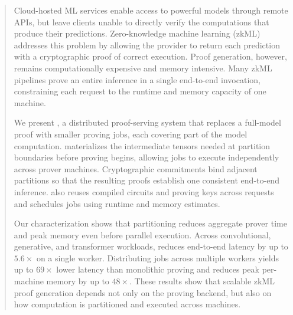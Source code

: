 
\begin{abstract}
Cloud-hosted ML services enable access to powerful models through remote APIs, but leave clients unable to directly verify the computations that produce their predictions. Zero-knowledge machine learning (zkML) addresses this problem by allowing the provider to return each prediction with a cryptographic proof of correct execution. Proof generation, however, remains computationally expensive and memory intensive. Many zkML pipelines prove an entire inference in a single end-to-end invocation, constraining each request to the runtime and memory capacity of one machine.

We present \TITLE{}, a distributed proof-serving system that replaces a full-model proof with smaller proving jobs, each covering part of the model computation. \TITLE{} materializes the intermediate tensors needed at partition boundaries before proving begins, allowing jobs to execute independently across prover machines. Cryptographic commitments bind adjacent partitions so that the resulting proofs establish one consistent end-to-end inference. \TITLE{} also reuses compiled circuits and proving keys across requests and schedules jobs using runtime and memory estimates.

Our characterization shows that partitioning reduces aggregate prover time and peak memory even before parallel execution. Across convolutional, generative, and transformer workloads, \TITLE{} reduces end-to-end latency by up to \(5.6\times\) on a single worker. Distributing jobs across multiple workers yields up to \(69\times\) lower latency than monolithic proving and reduces peak per-machine memory by up to \(48\times\). These results show that scalable zkML proof generation depends not only on the proving backend, but also on how computation is partitioned and executed across machines.
\end{abstract}

